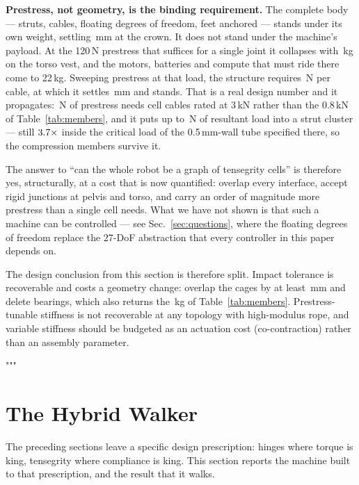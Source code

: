 \documentclass[conference]{IEEEtran}
\begin{document}
\textbf{Prestress, not geometry, is the binding requirement.} The complete
body --- \cgStruts{} struts, \cgCables{} cables, \cgDof{} floating degrees of
freedom, feet anchored --- stands under its own weight, settling
\cgSettle\,mm at the crown. It does not stand under the machine's payload. At
the 120\,N prestress that suffices for a single joint it collapses with
\cgLoadFail\,kg on the torso vest, and the motors, batteries and compute that
must ride there come to 22\,kg. Sweeping prestress at that load, the structure
requires \cgPreNeeded\,N per cable, at which it settles \cgPreSettle\,mm and
stands. That is a real design number and it propagates: \cgPreNeeded\,N of
prestress needs cell cables rated at 3\,kN rather than the 0.8\,kN of
Table~\ref{tab:members}, and it puts up to \cgNodeLoad\,N of resultant load
into a strut cluster --- still $3.7\times$ inside the critical load
of the 0.5\,mm-wall tube specified there, so the compression members survive
it.

The answer to ``can the whole robot be a graph of tensegrity cells'' is
therefore yes, structurally, at a cost that is now quantified: overlap every
interface, accept rigid junctions at pelvis and torso, and carry an order of
magnitude more prestress than a single cell needs. What we have not shown is
that such a machine can be controlled --- see Sec.~\ref{sec:questions}, where
the \cgDof{} floating degrees of freedom replace the 27-DoF abstraction that
every controller in this paper depends on.

The design conclusion from this section is therefore split. Impact tolerance
is recoverable and costs a geometry change: overlap the cages by at least
\jointOverlapMm\,mm and delete \hingeDofCount{} bearings, which also returns
the \bearingMass\,kg of Table~\ref{tab:members}. Prestress-tunable stiffness
is not recoverable at any topology with high-modulus rope, and variable
stiffness should be budgeted as an actuation cost (co-contraction) rather than
an assembly parameter.

"""
\section{The Hybrid Walker}
\label{sec:hybridwalker}
The preceding sections leave a specific design prescription: hinges where
torque is king, tensegrity where compliance is king. This section reports the
machine built to that prescription, and the result that it walks.
\end{document}
